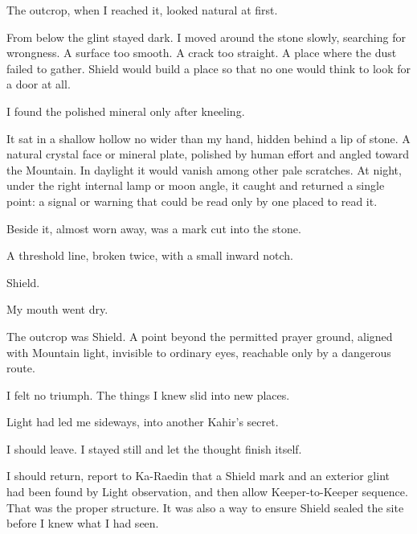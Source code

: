 The outcrop, when I reached it, looked natural at first.\par

From below the glint stayed dark. I moved around the stone slowly, searching for wrongness. A surface too smooth. A crack too straight. A place where the dust failed to gather. Shield would build a place so that no one would think to look for a door at all.\par

I found the polished mineral only after kneeling.\par

It sat in a shallow hollow no wider than my hand, hidden behind a lip of stone. A natural crystal face or mineral plate, polished by human effort and angled toward the Mountain. In daylight it would vanish among other pale scratches. At night, under the right internal lamp or moon angle, it caught and returned a single point: a signal or warning that could be read only by one placed to read it.\par

Beside it, almost worn away, was a mark cut into the stone.\par

A threshold line, broken twice, with a small inward notch.\par

Shield.\par

My mouth went dry.\par

The outcrop was Shield. A point beyond the permitted prayer ground, aligned with Mountain light, invisible to ordinary eyes, reachable only by a dangerous route.\par

I felt no triumph. The things I knew slid into new places.\par

Light had led me sideways, into another Kahir's secret.\par

I should leave. I stayed still and let the thought finish itself.\par

I should return, report to Ka-Raedin that a Shield mark and an exterior glint had been found by Light observation, and then allow Keeper-to-Keeper sequence. That was the proper structure. It was also a way to ensure Shield sealed the site before I knew what I had seen.\par


